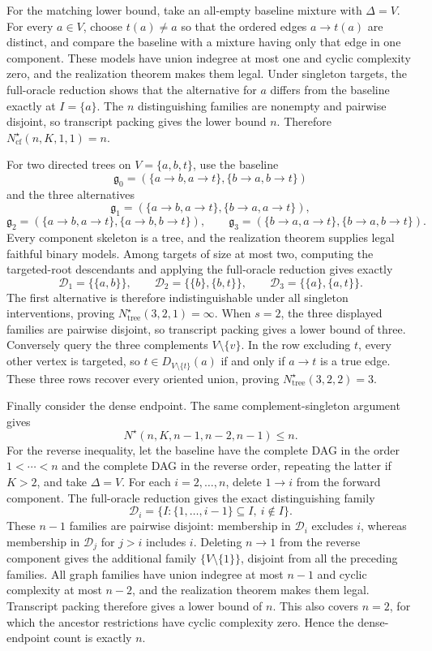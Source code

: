 For the matching lower bound, take an all-empty baseline mixture with \(\Delta=V\). For every \(a\in V\), choose \(t(a)\ne a\) so that the ordered edges \(a\to t(a)\) are distinct, and compare the baseline with a mixture having only that edge in one component. These models have union indegree at most one and cyclic complexity zero, and the realization theorem makes them legal. Under singleton targets, the full-oracle reduction shows that the alternative for \(a\) differs from the baseline exactly at \(I=\{a\}\). The \(n\) distinguishing families are nonempty and pairwise disjoint, so transcript packing gives the lower bound \(n\). Therefore \(N^{\star}_{\mathrm{cf}}(n,K,1,1)=n\).

For two directed trees on \(V=\{a,b,t\}\), use the baseline
\[
 \mathfrak g_0=(\{a\to b,a\to t\},\{b\to a,b\to t\})
\]
and the three alternatives
\[
 \mathfrak g_1=(\{a\to b,a\to t\},\{b\to a,a\to t\}),
\]
\[
 \mathfrak g_2=(\{a\to b,a\to t\},\{a\to b,b\to t\}),
\qquad
 \mathfrak g_3=(\{b\to a,a\to t\},\{b\to a,b\to t\}).
\]
Every component skeleton is a tree, and the realization theorem supplies legal faithful binary models. Among targets of size at most two, computing the targeted-root descendants and applying the full-oracle reduction gives exactly
\[
 \mathscr D_1=\{\{a,b\}\},\qquad
 \mathscr D_2=\{\{b\},\{b,t\}\},\qquad
 \mathscr D_3=\{\{a\},\{a,t\}\}.
\]
The first alternative is therefore indistinguishable under all singleton interventions, proving \(N^{\star}_{\mathrm{tree}}(3,2,1)=\infty\). When \(s=2\), the three displayed families are pairwise disjoint, so transcript packing gives a lower bound of three. Conversely query the three complements \(V\setminus\{v\}\). In the row excluding \(t\), every other vertex is targeted, so \(t\in D_{V\setminus\{t\}}(a)\) if and only if \(a\to t\) is a true edge. These three rows recover every oriented union, proving \(N^{\star}_{\mathrm{tree}}(3,2,2)=3\).

Finally consider the dense endpoint. The same complement-singleton argument gives
\[
 N^{\star}(n,K,n-1,n-2,n-1)\le n.
\]
For the reverse inequality, let the baseline have the complete DAG in the order \(1<\cdots<n\) and the complete DAG in the reverse order, repeating the latter if \(K>2\), and take \(\Delta=V\). For each \(i=2,\ldots,n\), delete \(1\to i\) from the forward component. The full-oracle reduction gives the exact distinguishing family
\[
 \mathscr D_i=\{I:\{1,\ldots,i-1\}\subseteq I,\ i\notin I\}.
\]
These \(n-1\) families are pairwise disjoint: membership in \(\mathscr D_i\) excludes \(i\), whereas membership in \(\mathscr D_j\) for \(j>i\) includes \(i\). Deleting \(n\to1\) from the reverse component gives the additional family \(\{V\setminus\{1\}\}\), disjoint from all the preceding families. All graph families have union indegree at most \(n-1\) and cyclic complexity at most \(n-2\), and the realization theorem makes them legal. Transcript packing therefore gives a lower bound of \(n\). This also covers \(n=2\), for which the ancestor restrictions have cyclic complexity zero. Hence the dense-endpoint count is exactly \(n\).
